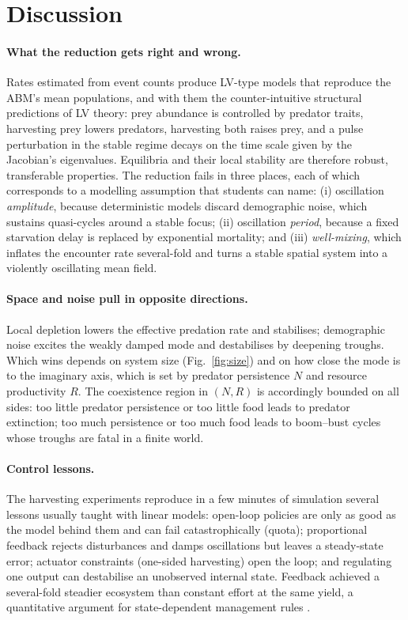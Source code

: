 \FloatBarrier
\section{Discussion}
\paragraph{What the reduction gets right and wrong.} Rates estimated from event counts produce LV-type
models that reproduce the ABM's mean populations, and with them the counter-intuitive structural
predictions of LV theory: prey abundance is controlled by predator traits, harvesting prey lowers predators,
harvesting both raises prey, and a pulse perturbation in the stable regime decays on the time scale given by
the Jacobian's eigenvalues. Equilibria and their local stability are therefore robust, transferable
properties. The reduction fails in three places, each of which corresponds to a modelling assumption that
students can name: (i) oscillation \emph{amplitude}, because deterministic models discard demographic noise,
which sustains quasi-cycles around a stable focus; (ii) oscillation \emph{period}, because a fixed
starvation delay is replaced by exponential mortality; and (iii) \emph{well-mixing}, which inflates the
encounter rate several-fold and turns a stable spatial system into a violently oscillating mean field.

\paragraph{Space and noise pull in opposite directions.} Local depletion lowers the effective predation
rate and stabilises; demographic noise excites the weakly damped mode and destabilises by deepening
troughs. Which wins depends on system size (Fig.~\ref{fig:size}) and on how close the mode is to the
imaginary axis, which is set by predator persistence $N$ and resource productivity $R$. The coexistence
region in $(N,R)$ is accordingly bounded on all sides: too little predator persistence or too little food
leads to predator extinction; too much persistence or too much food leads to boom--bust cycles whose troughs
are fatal in a finite world.

\paragraph{Control lessons.} The harvesting experiments reproduce in a few minutes of simulation several
lessons usually taught with linear models: open-loop policies are only as good as the model behind them and
can fail catastrophically (quota); proportional feedback rejects disturbances and damps oscillations but
leaves a steady-state error; actuator constraints (one-sided harvesting) open the loop; and regulating one
output can destabilise an unobserved internal state. Feedback achieved a several-fold steadier ecosystem
than constant effort at the same yield, a quantitative argument for state-dependent management rules
\cite{clark1990}.

